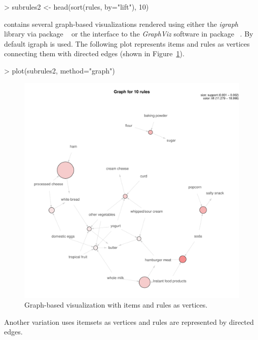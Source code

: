 \documentclass[nojss]{jss}
\begin{document}
\begin{Schunk}
\begin{Sinput}
> subrules2 <- head(sort(rules, by="lift"), 10)
\end{Sinput}
\end{Schunk}

 contains several graph-based visualizations
rendered using
either the \emph{igraph} library via package
~\citep{arulesViz:Csardi2006}
or
the interface to the \emph{GraphViz} software in
package ~\citep{arules:Gentry:2010}.
By default igraph is used.
The following
plot represents items and rules as vertices connecting them with directed edges
(shown in Figure~\ref{fig:graph1}).

\begin{Schunk}
\begin{Sinput}
> plot(subrules2, method="graph")
\end{Sinput}
\end{Schunk}

\begin{figure}
\centering
\includegraphics[width=\linewidth]{arulesViz-graph1}
\caption{Graph-based visualization with items and rules as vertices.
\label{fig:graph1}}
\end{figure}


Another variation uses itemsets as vertices and rules are represented by
directed edges.
\end{document}

